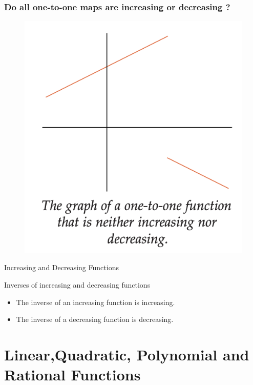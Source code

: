 \documentclass{beamer}
\begin{document}
  \begin{frame}
    \frametitle{Do all one-to-one maps are increasing or decreasing ? }
    \begin{figure}
      \centering
      \includegraphics[scale=0.6]{non-increse-decrese.png}
    \end{figure}
  \end{frame}
  \begin{frame}{Increasing and Decreasing Functions}

    \begin{alertblock}{Inverses of increasing and decreasing functions}
      \begin{itemize}
        \item The inverse of an increasing function is increasing.
        \item The inverse of a decreasing function is decreasing.
      \end{itemize}
    \end{alertblock}
  \end{frame}
  \section{Linear,Quadratic, Polynomial and Rational Functions}
\end{document}
